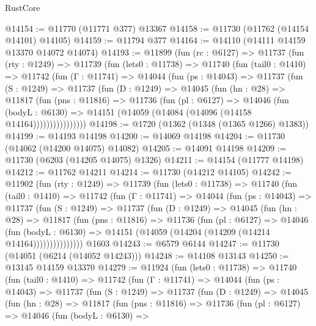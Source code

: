\begin{lexlean}{RustCore}
\begin{coremodule}
@14154 := @11770 (@11771 @377) @13367
@14158 := @11730 (@11762 (@14154 @14101) @14105)
@14159 := @11794 @377
@14164 := @14110 (@14111 @14159 @13370 @14072 @14074)
@14193 := @11899
    (fun (rc : @6127) =>
    @11737
      (fun (rty : @1249) =>
      @11739
        (fun (lets0 : @11738) =>
        @11740
          (fun (tail0 : @1410) =>
          @11742
            (fun (Γ : @11741) =>
            @14044
              (fun (ps : @14043) =>
              @11737
                (fun (S : @1249) =>
                @11737
                  (fun (D : @1249) =>
                  @14045
                    (fun (hn : @28) =>
                    @11817
                      (fun (pns : @11816) =>
                      @11736
                        (fun (pl : @6127) =>
                        @14046
                          (fun (bodyL : @6130) =>
                          @14151 (@14059 (@14084 (@14096 (@14158 @14164))))))))))))))))
@14198 := @1720 (@1362 (@1348 (@1365 @1266) @1383))
@14199 := @14193 @14198
@14200 := @14069 @14198
@14204 := @11730 (@14062 (@14200 @14075) @14082)
@14205 := @14091 @14198
@14209 := @11730 (@6203 (@14205 @14075) @1326)
@14211 := @14154 (@11777 @14198)
@14212 := @11762 @14211
@14214 := @11730 (@14212 @14105)
@14242 := @11902
    (fun (rty : @1249) =>
    @11739
      (fun (lets0 : @11738) =>
      @11740
        (fun (tail0 : @1410) =>
        @11742
          (fun (Γ : @11741) =>
          @14044
            (fun (ps : @14043) =>
            @11737
              (fun (S : @1249) =>
              @11737
                (fun (D : @1249) =>
                @14045
                  (fun (hn : @28) =>
                  @11817
                    (fun (pns : @11816) =>
                    @11736
                      (fun (pl : @6127) =>
                      @14046
                        (fun (bodyL : @6130) =>
                        @14151 (@14059 (@14204 (@14209 (@14214 @14164)))))))))))))))
    @1603
@14243 := @6579 @6144
@14247 := @11730 (@14051 (@6214 (@14052 @14243)))
@14248 := @14108 @13143
@14250 := @13145 @14159 @13370
@14279 := @11924
    (fun (lets0 : @11738) =>
    @11740
      (fun (tail0 : @1410) =>
      @11742
        (fun (Γ : @11741) =>
        @14044
          (fun (ps : @14043) =>
          @11737
            (fun (S : @1249) =>
            @11737
              (fun (D : @1249) =>
              @14045
                (fun (hn : @28) =>
                @11817
                  (fun (pns : @11816) =>
                  @11736
                    (fun (pl : @6127) =>
                    @14046
                      (fun (bodyL : @6130) =>

\end{coremodule}
\end{lexlean}

